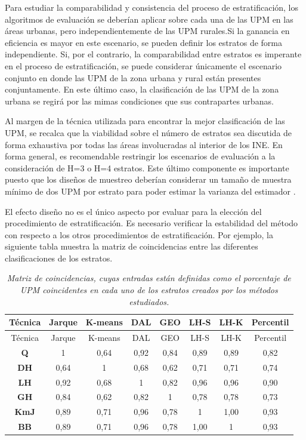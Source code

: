 \documentclass[
  12pt,
  spanish,
]{book}
\begin{document}
\normalsize

Para estudiar la comparabilidad y consistencia del proceso de estratificación, los algoritmos de evaluación se deberían aplicar sobre cada una de las UPM en las áreas urbanas, pero independientemente de las UPM rurales.Si la ganancia en eficiencia es mayor en este escenario, se pueden definir los estratos de forma independiente. Si, por el contrario, la comparabilidad entre estratos es imperante en el proceso de estratificación, se puede considerar únicamente el escenario conjunto en donde las UPM de la zona urbana y rural están presentes conjuntamente. En este último caso, la clasificación de las UPM de la zona urbana se regirá por las mimas condiciones que sus contrapartes urbanas.

Al margen de la técnica utilizada para encontrar la mejor clasificación de las UPM, se recalca que la viabilidad sobre el número de estratos sea discutida de forma exhaustiva por todas las áreas involucradas al interior de los INE. En forma general, es recomendable restringir los escenarios de evaluación a la consideración de H=3 o H=4 estratos. Este último componente es importante puesto que los diseños de muestreo deberían considerar un tamaño de muestra mínimo de dos UPM por estrato para poder estimar la varianza del estimador \citep{Gutierrez_2016}.

El efecto diseño no es el único aspecto por evaluar para la elección del procedimiento de estratificación. Es necesario verificar la estabilidad del método con respecto a los otros procedimientos de estratificación. Por ejemplo, la siguiente tabla muestra la matriz de coincidencias entre las diferentes clasificaciones de los estratos.

\begin{longtable}[]{@{}cccccccc@{}}
\caption{\emph{Matriz de coincidencias, cuyas entradas están definidas como el porcentaje de UPM coincidentes en cada uno de los estratos creados por los métodos estudiados.}}\tabularnewline
\toprule
Técnica & Jarque & K-means & DAL & GEO & LH-S & LH-K & Percentil \\
\midrule
\endfirsthead
\toprule
Técnica & Jarque & K-means & DAL & GEO & LH-S & LH-K & Percentil \\
\midrule
\endhead
\textbf{Q} & 1 & 0,64 & 0,92 & 0,84 & 0,89 & 0,89 & 0,82 \\
\textbf{DH} & 0,64 & 1 & 0,68 & 0,62 & 0,71 & 0,71 & 0,74 \\
\textbf{LH} & 0,92 & 0,68 & 1 & 0,82 & 0,96 & 0,96 & 0,90 \\
\textbf{GH} & 0,84 & 0,62 & 0,82 & 1 & 0,78 & 0,78 & 0,73 \\
\textbf{KmJ} & 0,89 & 0,71 & 0,96 & 0,78 & 1 & 1,00 & 0,93 \\
\textbf{BB} & 0,89 & 0,71 & 0,96 & 0,78 & 1,00 & 1 & 0,93 \\
\bottomrule
\end{longtable}
\end{document}

